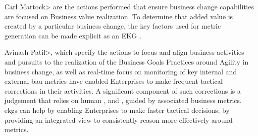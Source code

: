 Carl Mattock>\textbf{} are the actions performed that ensure
business change capabilities are focused on Business value realization.
To determine that added value is created by a particular business change, the key factors used for metric generation
can be made explicit as an EKG .

Avinash Patil>\textbf{}, which specify the actions to focus and align
business activities and pursuits to the realization of the Business Goals Practices around Agility in
business change, as well as real-time focus on monitoring of key internal and external \gls{bau} metrics have enabled
Enterprises to make frequent tactical corrections in their activities.
A significant component of such corrections is a judgement that relies on human , 
and , guided by associated business metrics.
\Glspl{ekg} can help by enabling Enterprises to make faster tactical decisions, by providing an integrated view to
consistently reason more effectively around metrics.

